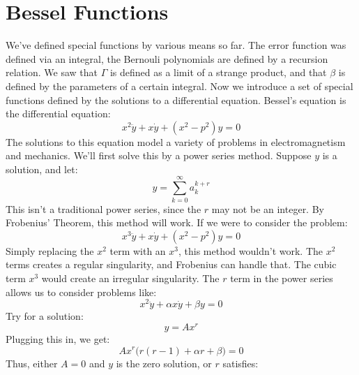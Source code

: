 \documentclass[crop=false,class=book,oneside]{standalone}
\begin{document}
    \section{Bessel Functions}
        We've defined special functions by various means so far.
        The error function was defined via an integral, the
        Bernouli polynomials are defined by a recursion relation.
        We saw that $\Gamma$ is defined as a limit of a strange
        product, and that $\beta$ is defined by the parameters of
        a certain integral. Now we introduce a set of special
        functions defined by the solutions to a differential equation.
        Bessel's equation is the differential equation:
        \begin{equation}
            x^{2}\ddot{y}+x\dot{y}+(x^{2}-p^{2})y=0
        \end{equation}
        The solutions to this equation model a variety of problems
        in electromagnetism and mechanics. We'll first solve this
        by a power series method. Suppose $y$ is a solution, and let:
        \begin{equation}
            y=\sum_{k=0}^{\infty}a_{k}^{k+r}
        \end{equation}
        This isn't a traditional power series, since the $r$ may not
        be an integer. By Frobenius' Theorem, this method will work.
        If we were to consider the problem:
        \begin{equation}
            x^{3}\ddot{y}+x\dot{y}+(x^{2}-p^{2})y=0
        \end{equation}
        Simply replacing the $x^{2}$ term with an $x^{3}$, this method
        wouldn't work. The $x^{2}$ terms creates a regular
        singularity, and Frobenius can handle that. The cubic
        term $x^{3}$ would create an irregular singularity. The
        $r$ term in the power series allows us to consider problems
        like:
        \begin{equation}
            x^{2}\ddot{y}+\alpha{x}\dot{y}+\beta{y}=0
        \end{equation}
        Try for a solution:
        \begin{equation}
            y=Ax^{r}
        \end{equation}
        Plugging this in, we get:
        \begin{equation}
            Ax^{r}\big(r(r-1)+\alpha{r}+\beta\big)=0
        \end{equation}
        Thus, either $A=0$ and $y$ is the zero solution, or $r$
        satisfies:
\end{document}
